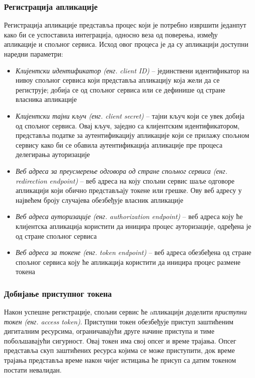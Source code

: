 \documentclass[12pt,oneside]{memoir}
\begin{document}
\subsubsection*{Регистрација апликације}

Регистрација апликације представља процес који је потребно извршити једанпут како би се успоставила интеграција, односно веза од поверења, између апликације и спољног сервиса. Исход овог процеса је да су апликацији доступни наредни параметри:

\begin{itemize}[--]
    \item \textit{Клијентски идентификатор (енг. client ID)} -- јединствени идентификатор на нивоу спољног сервиса који представља апликацију која жели да се региструје; добија се од спољног сервиса или се дефинише од стране власника апликације 
    \item \textit{Клијентски тајни кључ (енг. client secret)} -- тајни кључ који се увек добија од спољног сервиса. Овај кључ, заједно са клијентским идентификатором, представља податке за аутентификацију апликације који се прилажу спољном сервису како би се обавила аутентификација апликације пре процеса делегирања ауторизације
    \item \textit{Веб адреса за преусмерење одговора од стране спољног сервиса (енг. re\-di\-rec\-tion endpoint)} -- веб адреса на коју спољни сервис шаље одговоре апликацији који обично представљају токене или грешке. Ову веб адресу у највећем броју случајева обезбеђује власник апликације
    \item \textit{Веб адреса ауторизације (енг. authorization endpoint)} -- веб адреса коју ће клијентска апликација користити да иницира процес ауторизације, одређена је од стране спољног сервиса
    \item \textit{Веб адреса за токене (енг. token endpoint)} -- веб адреса обезбеђена од стране спољног сервиса коју ће апликација користити да иницира процес размене токена
\end{itemize}

\subsubsection*{Добијање приступног токена}


Након успешне регистрације, спољни сервис ће aпликацији доделити \textit{приступни токен (енг. access token)}. Приступни токен обезбеђује приступ заштићеним дигиталним ресурсима, ограничавајући друге начине приступа и тиме побољшавајући сигурност.
Овај токен има свој опсег и време трајања. Опсег представља скуп заштићених ресурса 
којима се може приступити, док време трајања представља време након чијег истицања ће присуп са датим токеном постати невалидан.
\end{document}
